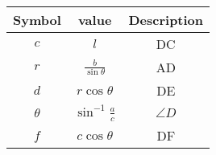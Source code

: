 \begin{tabular}{|c|c|c|}
\hline
Symbol & value & Description\\
\hline
$c$ & $l$ & DC\\
\hline
$r$ & $\frac{b}{\sin{\theta}}$ & AD \\
\hline
$d$ & $r\cos{\theta}$ & DE \\
\hline
$\theta$ & $\sin^{-1}\frac{a}{c}$ & $\angle{D}$ \\
\hline
$f$ & $c\cos{\theta}$ & DF\\
\hline
\end{tabular}


